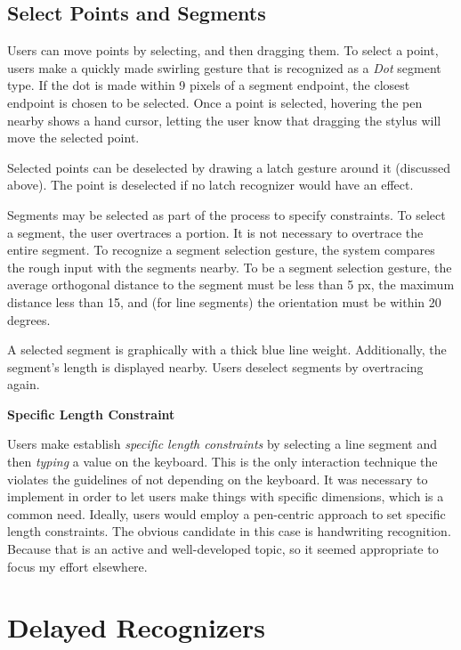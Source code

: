 

\subsection{Select Points and Segments}

Users can move points by selecting, and then dragging them. To select
a point, users make a quickly made swirling gesture that is recognized
as a \textit{Dot} segment type. If the dot is made within 9 pixels of
a segment endpoint, the closest endpoint is chosen to be
selected. Once a point is selected, hovering the pen nearby shows a
hand cursor, letting the user know that dragging the stylus will move
the selected point.

Selected points can be deselected by drawing a latch gesture around it
(discussed above). The point is deselected if no latch recognizer
would have an effect.

Segments may be selected as part of the process to specify  constraints. To select a segment, the user overtraces a
portion. It is not necessary to overtrace the entire segment. To
recognize a segment selection gesture, the system compares the rough
input with the segments nearby. To be a segment selection gesture, the
average orthogonal distance to the segment must be less than 5 px, the
maximum distance less than 15, and (for line segments) the orientation
must be within 20 degrees.

A selected segment is graphically with a thick blue line
weight. Additionally, the segment's length is displayed nearby. Users
deselect segments by overtracing again.

\vspace{16pt}
\textbf{Specific Length Constraint}

Users make establish \textit{specific length constraints} by selecting
a line segment and then \textit{typing} a value on the keyboard. This
is the only interaction technique the violates the guidelines of not
depending on the keyboard. It was necessary to implement in order to
let users make things with specific dimensions, which is a common
need. Ideally, users would employ a pen-centric approach to set
specific length constraints. The obvious candidate in this case is
handwriting recognition. Because that is an active and well-developed
topic, so it seemed appropriate to focus my effort elsewhere.

\section{Delayed Recognizers}

